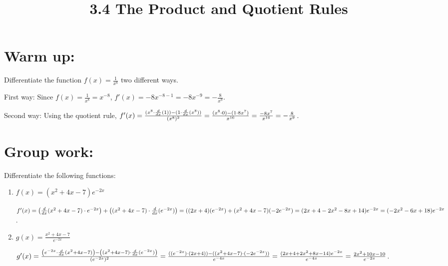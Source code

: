 \documentclass[handout,nooutcomes]{ximera}
\title{3.4 The Product and Quotient Rules}
\begin{document}
\begin{abstract}		\end{abstract}
\maketitle

\section*{Warm up:} 
Differentiate the function $f(x) = \frac{1}{x^8}$ two different ways.

	\begin{freeResponse}
	First way:  Since $f(x) = \frac{1}{x^8} = x^{-8}$, $f'(x) = -8x^{-8-1} = -8x^{-9} = -\frac{8}{x^9}$.
	
	Second way:  Using the quotient rule, 
	$f'(x) = \frac{(x^8 \cdot \frac{d}{dx}(1)) - (1 \cdot \frac{d}{dx}(x^8))}{(x^8)^2}
	= \frac{(x^8 \cdot 0) - (1 \cdot 8x^7)}{x^{16}}
	= \frac{-8x^7}{x^{16}}
	= - \frac{8}{x^9}$.
	\end{freeResponse}	
	
	
	
	
	

\section*{Group work:}

\begin{problem}
Differentiate the following functions:

	\begin{enumerate}
	
	\item  $f(x) = (x^2 + 4x - 7) e^{-2x}$
			\begin{freeResponse}
			$f'(x) = \left( \frac{d}{dx}(x^2 + 4x - 7) \cdot e^{-2x} \right) + \left((x^2 + 4x - 7) \cdot \frac{d}{dx}(e^{-2x}) \right)
			= ((2x+4)(e^{-2x}) + (x^2 + 4x - 7)(-2e^{-2x})
			= (2x + 4 - 2x^2 - 8x + 14)e^{-2x}
			= (-2x^2 - 6x + 18)e^{-2x}$.
			\end{freeResponse}
			
			
			
	\item  $g(x) = \frac{x^2 + 4x - 7}{e^{-2x}}$
			\begin{freeResponse}
			$g'(x) = \frac{\left( e^{-2x} \cdot \frac{d}{dx}(x^2 + 4x - 7) \right) - \left( (x^2 + 4x - 7) \cdot \frac{d}{dx}(e^{-2x}) \right)}{(e^{-2x})^2}
			= \frac{((e^{-2x}) \cdot (2x+4)) - ((x^2 + 4x - 7) \cdot (-2e^{-2x}))}{e^{-4x}}
			= \frac{(2x + 4 + 2x^2 + 8x - 14)e^{-2x}}{e^{-4x}}
			= \frac{2x^2 + 10x - 10}{e^{-2x}}$.
			\end{freeResponse}
			
			
			
			
	\end{enumerate}		
\end{problem}
	
\end{document}
